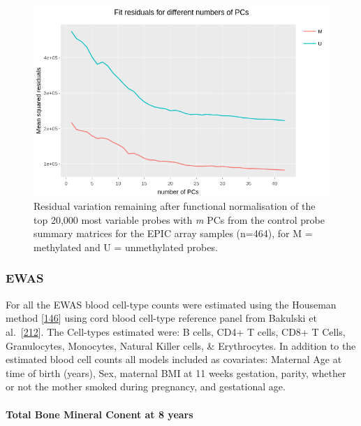 \documentclass[
]{book}
\begin{document}
\begin{figure}

{\centering \includegraphics[width=0.8\linewidth]{figs/SWSfunnormPCsEPIC} 

}

\caption{Residual variation remaining after functional normalisation of the top 20,000 most variable probes with \emph{m} PCs from the control probe summary matrices for the EPIC array samples (n=464), for M = methylated and U = unmethylated probes.}\label{fig:SWSfunnormPCsEPIC}
\end{figure}



\hypertarget{ewas-1}{%
\subsubsection{EWAS}\label{ewas-1}}

For all the EWAS blood cell-type counts were estimated using the Houseman method {[}\protect\hyperlink{ref-Houseman2012}{146}{]} using cord blood cell-type reference panel from Bakulski et al.~{[}\protect\hyperlink{ref-Bakulski2016}{212}{]}.
The Cell-types estimated were: B cells, CD4+ T cells, CD8+ T Cells, Granulocytes, Monocytes, Natural Killer cells, \& Erythrocytes.
In addition to the estimated blood cell counts all models included as covariates: Maternal Age at time of birth (years), Sex, maternal BMI at 11 weeks gestation, parity, whether or not the mother smoked during pregnancy, and gestational age.

\hypertarget{total-bone-mineral-conent-at-8-years}{%
\paragraph{Total Bone Mineral Conent at 8 years}\label{total-bone-mineral-conent-at-8-years}}
\end{document}
